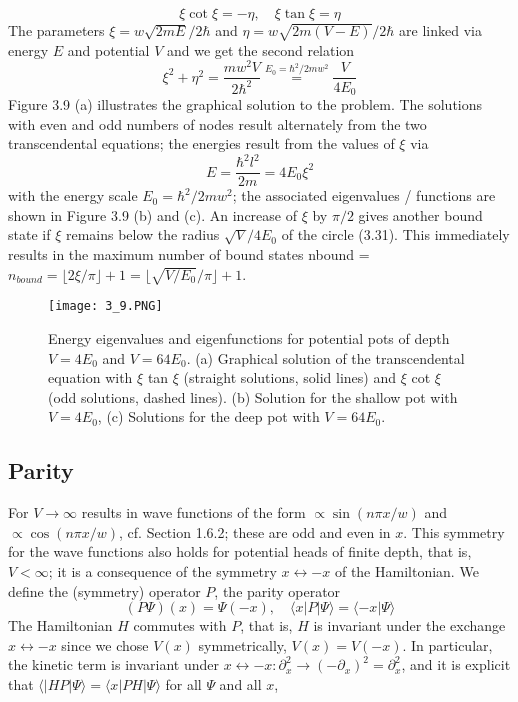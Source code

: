 \begin{equation}
    \xi \cot \xi=-\eta, \quad \xi \tan \xi=\eta
    \end{equation}
The parameters $\xi = w\sqrt{2mE}/2\hbar$ and $\eta = w\sqrt{2m(V-E)}/2\hbar$ are linked via energy $E$ and potential $V$ and we get the second relation
\begin{equation}
    \xi^{2}+\eta^{2}=\frac{m w^{2} V}{2 \hbar^{2}} \overset{E_{0}=\hbar^{2} /2m w^{2}}{=} \frac{V}{4 E_{0}}
    \end{equation}
Figure 3.9 (a) illustrates the graphical solution to the problem. The solutions with even and odd numbers of nodes result alternately from the two transcendental equations; the energies result from the values ​​of $\xi$ via
\begin{equation}
    E=\frac{\hbar^{2} l^{2}}{2 m}=4 E_{0} \xi^{2}
\end{equation}
with the energy scale $E_0 = \hbar^2 / 2mw^2$; the associated eigenvalues ​​/ functions are shown in Figure 3.9 (b) and (c). An increase of $\xi$ by $\pi / 2$ gives another bound state if $\xi$ remains below the radius $\sqrt{V} / 4E_0$ of the circle (3.31). This immediately results in the maximum number of bound states nbound = $n_{bound}=\lfloor 2\xi/\pi\rfloor+1=\lfloor\sqrt{V/E_0}/\pi\rfloor+1$.
\begin{figure}[ht]
        \centering
        \texttt{[image: 3\_9.PNG]}
        \caption{Energy eigenvalues and eigenfunctions for potential pots of depth $V = 4E_0$ and $V = 64E_0$. (a) Graphical solution of the transcendental equation with $\xi$ tan $\xi$ (straight solutions, solid lines) and $\xi$ cot $\xi$ (odd solutions, dashed lines). (b) Solution for the shallow pot with $V = 4E_0$, (c) Solutions for the deep pot with $V = 64E_0$.}
\end{figure}
\subsection{Parity}
For $V\to\infty$ results in wave functions of the form $\propto \operatorname{sin} (n\pi x / w)$ and $\propto \operatorname{cos} (n\pi x / w)$, cf. Section 1.6.2; these are odd and even in $x$. This symmetry for the wave functions also holds for potential heads of finite depth, that is, $V <\infty$; it is a consequence of the symmetry $x\longleftrightarrow -x$ of the Hamiltonian. We define the (symmetry) operator $P$, the parity operator
\begin{equation}
    (P \Psi)(x)=\Psi(-x), \quad\langle x|P| \Psi\rangle=\langle- x | \Psi\rangle
    \end{equation}
The Hamiltonian $H$ commutes with $P$, that is, $H$ is invariant under the exchange $x \longleftrightarrow -x$ since we chose $V (x)$ symmetrically, $V (x) = V (-x)$. In particular, the kinetic term is invariant under $x \longleftrightarrow -x: \partial_x^2\to (-\partial_x)^2=\partial_x^2$, and it is explicit that $\langle | HP | \Psi\rangle = \langle x | P H | \Psi\rangle$ for all $\Psi$ and all $x$,

